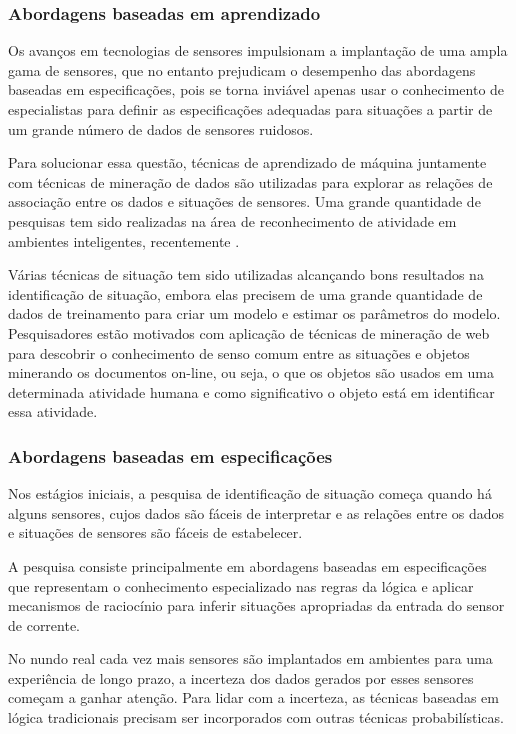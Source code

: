 \documentclass[12pt,a4paper,compsoc]{IEEEtran}
\begin{document}
\subsubsection{Abordagens baseadas em aprendizado}

  Os avanços em tecnologias de sensores impulsionam a implantação de uma ampla gama de sensores,
  que no entanto prejudicam o desempenho das abordagens baseadas em especificações, pois se torna
  inviável apenas usar o conhecimento de especialistas para definir as especificações adequadas
  para situações a partir de um grande número de dados de sensores ruidosos.
  
  Para solucionar essa questão, técnicas de aprendizado de máquina juntamente com técnicas de
  mineração de dados são utilizadas para explorar as relações de associação entre os dados e 
  situações de sensores. Uma grande quantidade de pesquisas tem sido realizadas na área de
  reconhecimento de atividade em ambientes inteligentes, recentemente \cite{knappmeyer2012survey}.
  
  Várias técnicas de situação tem sido utilizadas alcançando bons resultados na identificação de
  situação, embora elas precisem de uma grande quantidade de dados de treinamento para criar um
  modelo e estimar os parâmetros do modelo. Pesquisadores estão motivados com aplicação de técnicas
  de mineração de web para descobrir o conhecimento de senso comum entre as situações e objetos
  minerando os documentos on-line, ou seja, o que os objetos são usados em uma determinada 
  atividade humana e como significativo o objeto está em identificar essa atividade.


\subsubsection{Abordagens baseadas em especificações}

  Nos estágios iniciais, a pesquisa de identificação de situação começa quando há alguns sensores,
  cujos dados são fáceis de interpretar e as relações entre os dados e situações de sensores são 
  fáceis de estabelecer.
  
  A pesquisa consiste principalmente em abordagens baseadas em especificações que representam o
  conhecimento especializado nas regras da lógica e aplicar mecanismos de raciocínio para inferir
  situações apropriadas da entrada do sensor de corrente.
  
  No nundo real cada vez mais sensores são implantados em ambientes para uma experiência de longo
  prazo, a incerteza dos dados gerados por esses sensores  começam a ganhar atenção. Para lidar com
  a incerteza, as técnicas baseadas em lógica tradicionais precisam ser incorporados com outras
  técnicas probabilísticas.
\end{document}
